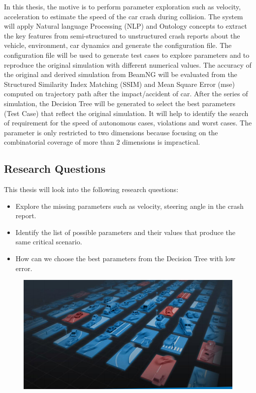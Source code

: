 In this thesis, the motive is to perform parameter exploration such as velocity, acceleration to estimate the speed of the car crash during collision.  The system will apply Natural language Processing (NLP) and Ontology concepts to extract the key features from semi-structured to unstructured crash reports about the vehicle, environment, car dynamics and generate the configuration file. The configuration file will be used to generate test cases to explore parameters and to reproduce the original simulation with different numerical values. The accuracy of the original and derived simulation from BeamNG\cite{beamng_research} will be evaluated from the Structured Similarity Index Matching (SSIM) and Mean Square Error (mse) computed on trajectory path after the impact/accident of car. After the series of simulation, the Decision Tree will be generated to select the best parameters (Test Case) that reflect the original simulation. It will help to identify the search of requirement for the speed of autonomous cases, violations and worst cases. The parameter is only restricted to two dimensions because focusing on the combinatorial coverage of more than 2 dimensions is impractical.

\subsection{Research Questions}
This thesis will look into the following research questions:

\begin{itemize}
  \item	Explore the missing parameters such as velocity, steering angle in the crash report.
  \item	Identify the list of possible parameters and their values that produce the same critical scenario.
  \item	How can we choose the best parameters from the Decision Tree with low error. 
\end{itemize}

\begin{figure}[H]
\centering
  \includegraphics[scale= 0.4]{pictures/CrashScenarios.png}
  \caption{}
\end{figure}

